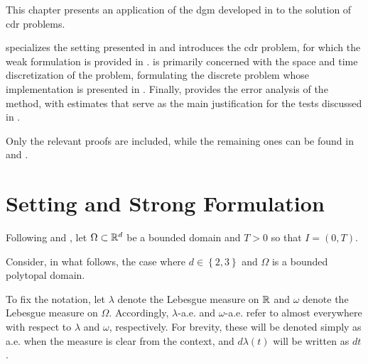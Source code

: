 This chapter presents an application of the \acrshort{dgm} developed in  to the solution of \acrshort{cdr} problems.

 specializes the setting presented in  and introduces the \acrshort{cdr} problem, for which the weak formulation is provided in .  is primarily concerned with the space and time discretization of the problem, formulating the discrete problem whose implementation is presented in . Finally,  provides the error analysis of the method, with estimates that serve as the main justification for the tests discussed in .

Only the relevant proofs are included, while the remaining ones can be found in  and .

\newpage
\section{Setting and Strong Formulation} \label{sec:cdr_introduction}

Following \cite{Feistauer2004} and \cite{Feistauer2007}, let $\Omega \subset \mathbb{R}^{d}$ be a bounded domain and $T > 0$ so that $I = \left( 0, T\right)$.

Consider, in what follows, the case where $d \in \left\{ 2, 3 \right\}$ and $\Omega$ is a bounded polytopal domain.

To fix the notation, let $\lambda$ denote the Lebesgue measure on $\mathbb{R}$ and $\omega$ denote the Lebesgue measure on $\Omega$. Accordingly, $\lambda$-a.e. and $\omega$-a.e. refer to almost everywhere with respect to $\lambda$ and $\omega$, respectively. For brevity, these will be denoted simply as a.e. when the measure is clear from the context, and $d\lambda(t)$ will be written as $dt$.

